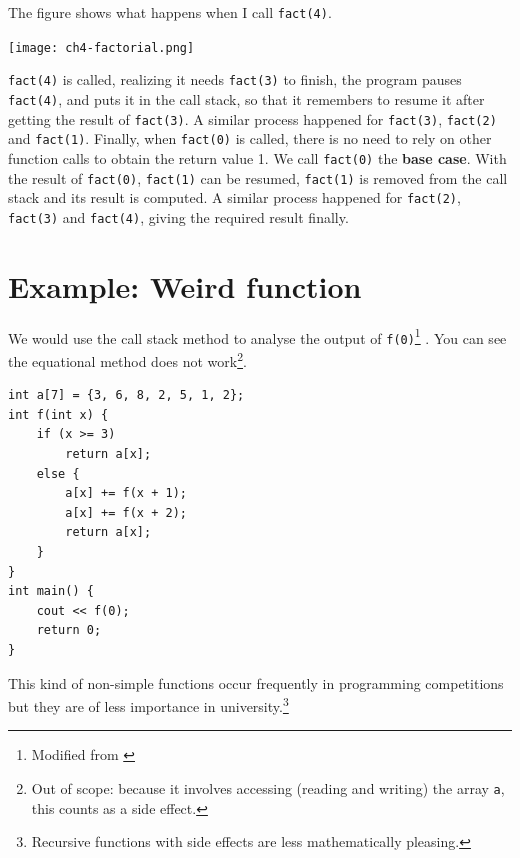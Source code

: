 The figure shows what happens when I call \texttt{fact(4)}.

\texttt{[image: ch4-factorial.png]}

\texttt{fact(4)} is called, realizing it needs \texttt{fact(3)} to finish, the program pauses \texttt{fact(4)}, and puts it in the call stack, so that it remembers to resume it after getting the result of \texttt{fact(3)}. A similar process happened for \texttt{fact(3)}, \texttt{fact(2)} and \texttt{fact(1)}. Finally, when \texttt{fact(0)} is called, there is no need to rely on other function calls to obtain the return value 1. We call \texttt{fact(0)} the \textbf{base case}. With the result of \texttt{fact(0)}, \texttt{fact(1)} can be resumed, \texttt{fact(1)} is removed from the call stack and its result is computed. A similar process happened for \texttt{fact(2)}, \texttt{fact(3)} and \texttt{fact(4)}, giving the required result finally.


\section{Example: Weird function}

We would use the call stack method to analyse the output of \texttt{f(0)}\footnote{Modified from \cite{hkoi:2022hs}} . You can see the equational method does not work\footnote{Out of scope: because it involves accessing (reading and writing) the array \texttt{a}, this counts as a side effect.}.

\begin{lstlisting}
int a[7] = {3, 6, 8, 2, 5, 1, 2};
int f(int x) {
    if (x >= 3)
        return a[x];
    else {
        a[x] += f(x + 1);
        a[x] += f(x + 2);
        return a[x];
    }
}
int main() {
    cout << f(0);
    return 0;
} 
\end{lstlisting}

This kind of non-simple functions occur frequently in programming competitions but they are of less importance in university.\footnote{Recursive functions with side effects are less mathematically pleasing.}

